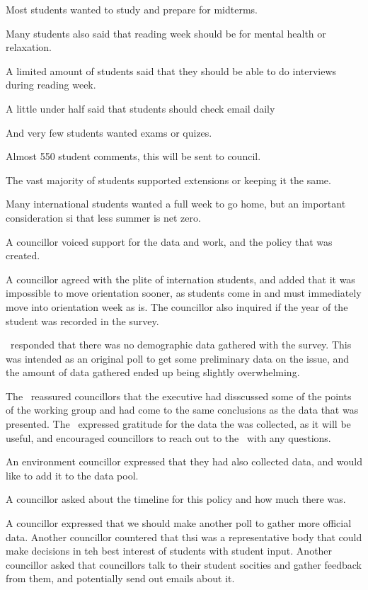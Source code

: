 \begin{motion}
\begin{information}
    Most students wanted to study and prepare for midterms. 

    Many students also said that reading week should be for mental health or
    relaxation. 

    A limited amount of students said that they should be able to do interviews
    during reading week. 

    A little under half said that students should check email daily

    And very few students wanted exams or quizes. 

    Almost 550 student comments, this will be sent to council. 

    The vast majority of students supported extensions or keeping it the same. 

    Many international students wanted a full week to go home, but an 
    important consideration si that less summer is net zero. 

    A councillor voiced support for the data and work, and the policy that
    was created. 

    A councillor agreed with the plite of internation students, and added that
    it was impossible to move orientation sooner, as students come in and 
    must immediately move into orientation week as is.  The councillor
    also inquired if the year of the student was recorded in the survey. 

    \seneca\ responded that there was no demographic data gathered with the
    survey. This was intended as an original poll to get some preliminary 
    data on the issue, and the amount of data gathered ended up being
    slightly overwhelming. 

    The \vpof\ reassured councillors that the executive had disscussed some
    of the points of the working group and had come to the same conclusions
    as the data that was presented. The \vpof\ expressed gratitude for the
    data the was collected, as it will be useful, and encouraged
    councillors to reach out to the \vpe\ with any questions. 

    An environment councillor expressed that they had also collected data, and
    would like to add it to the data pool. 

    A councillor asked about the timeline for this policy and how much 
    there was. 

    A councillor expressed that we should make another poll to gather more
    official data. Another councillor countered that thsi was a representative
    body that could make decisions in teh best interest of students with
    student input. Another councillor asked that councillors talk to their
    student socities and gather feedback from them, and potentially send
    out emails about it. 


\end{information}
\end{motion}
